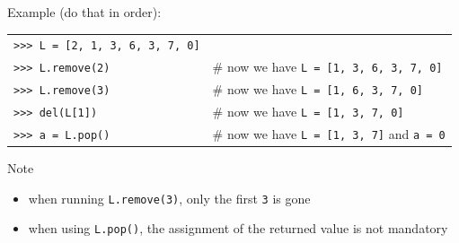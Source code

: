 \documentclass[t,handout,9pt]{beamer}
\begin{document}
\begin{frame}
\vfill
Example (do that in order):
\begin{table}[]
\begin{flushleft}
\begin{tabular}{ll}
\texttt{>{}>{}> L = [2, 1, 3, 6, 3, 7, 0]} &  \\
\texttt{>{}>{}> L.remove(2)} & \# now we have \texttt{L = [1, 3, 6, 3, 7, 0]}  \\
\texttt{>{}>{}> L.remove(3)} & \# now we have \texttt{L = [1, 6, 3, 7, 0]}\\
\texttt{>{}>{}> del(L[1])} & \# now we have \texttt{L = [1, 3, 7, 0]}\\
\texttt{>{}>{}> a = L.pop()} & \# now we have \texttt{L = [1, 3, 7]} and \texttt{a = 0} \\
\end{tabular}
\end{flushleft}
\end{table}
\vfill
\begin{block}{Note}
\begin{itemize}
	\item when running \texttt{L.remove(3)}, only the first \texttt{3} is gone
	\item when using \texttt{L.pop()}, the assignment of the returned value is not mandatory
\end{itemize}
\end{block}
\vfill
\end{frame}
%
\end{document}
